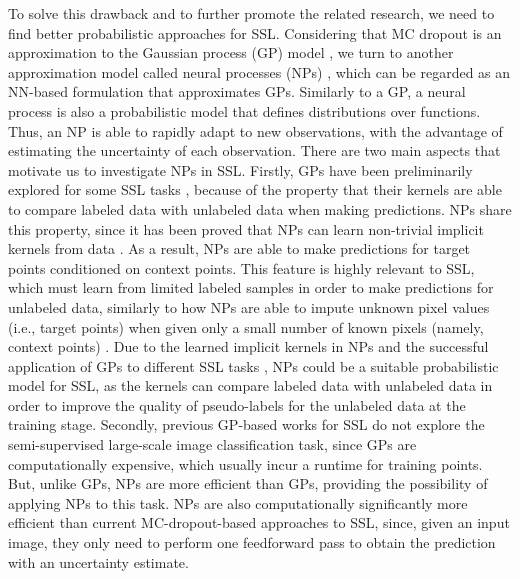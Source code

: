 \documentclass[nohyperref]{article}
\theoremstyle{plain}
\theoremstyle{definition}
\theoremstyle{remark}
\begin{document}
To solve this drawback and to further promote the related research, we need to find better probabilistic approaches for SSL. 
Considering that MC dropout is an approximation to the Gaussian process (GP) model \cite{gal2016dropout}, we turn to another approximation model called
neural processes (NPs) \cite{garnelo2018neural}, which can be regarded as an NN-based formulation that approximates GPs.
Similarly to a GP, a neural process  is also a probabilistic model that defines distributions over functions.
Thus, an NP is able to rapidly adapt to new observations, with the advantage of estimating the uncertainty of each observation.
There are two main aspects that motivate us to investigate NPs in SSL. 
Firstly, GPs have been preliminarily explored for some SSL tasks \cite{sindhwani2007semi, jean2018semi, yasarla2020syn2real}, because of the property that their kernels are able to compare labeled data with unlabeled data when making predictions. 
NPs share this property, since it has been proved that NPs can learn non-trivial implicit kernels from data \cite{garnelo2018neural}. As a result, NPs are able to make predictions for target points conditioned on context points. This feature is highly relevant to SSL, which must learn from limited labeled samples in order to make predictions for unlabeled data, similarly to how NPs are able to impute unknown pixel values (i.e., target points) when given only a small number of known pixels (namely, context points) \cite{garnelo2018neural}. 
Due to the learned implicit kernels in NPs \cite{garnelo2018neural} and the successful application of GPs to different SSL tasks \cite{sindhwani2007semi, jean2018semi, yasarla2020syn2real}, NPs could be a suitable probabilistic model for SSL, as the kernels can compare labeled data with unlabeled data in order to improve the quality of pseudo-labels for the unlabeled data at the training stage. Secondly, previous GP-based works for SSL do not explore the semi-supervised large-scale image classification task, since GPs are computationally expensive, which usually incur a  runtime for  training points. But, unlike GPs, NPs are more efficient than GPs, providing the possibility of applying NPs to this task. NPs are also computationally significantly more efficient than current MC-dropout-based approaches to SSL, since, given an input image, they only need to perform one feedforward pass to obtain the prediction with an uncertainty estimate. 
\end{document}
